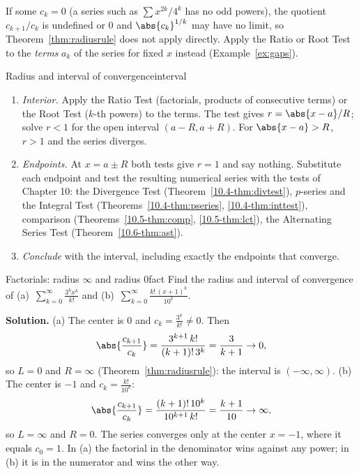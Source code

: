 \documentclass[11pt]{article}
\begin{document}
\begin{warn}
If some $c_k=0$ (a series such as $\sum x^{2k}/4^k$ has no odd powers), the quotient $c_{k+1}/c_k$ is undefined or $0$ and $\abs{c_k}^{1/k}$ may have no limit, so Theorem~\ref{thm:radiusrule} does not apply directly. Apply the Ratio or Root Test to the \emph{terms} $a_k$ of the series for fixed $x$ instead (Example~\ref{ex:gaps}).
\end{warn}

\begin{proc}{Radius and interval of convergence}{interval}
\begin{enumerate}[nosep]
  \item \emph{Interior.} Apply the Ratio Test (factorials, products of consecutive terms) or the Root Test ($k$-th powers) to the terms. The test gives $r=\abs{x-a}/R$; solve $r<1$ for the open interval $(a-R,a+R)$. For $\abs{x-a}>R$, $r>1$ and the series diverges.
  \item \emph{Endpoints.} At $x=a\pm R$ both tests give $r=1$ and say nothing. Substitute each endpoint and test the resulting numerical series with the tests of Chapter 10: the Divergence Test (Theorem~\ref{10.4-thm:divtest}), $p$-series and the Integral Test (Theorems~\ref{10.4-thm:pseries}, \ref{10.4-thm:inttest}), comparison (Theorems~\ref{10.5-thm:comp}, \ref{10.5-thm:lct}), the Alternating Series Test (Theorem~\ref{10.6-thm:ast}).
  \item \emph{Conclude} with the interval, including exactly the endpoints that converge.
\end{enumerate}
\end{proc}

\begin{exmp}{Factorials: radius $\infty$ and radius $0$}{fact}
Find the radius and interval of convergence of (a)~$\displaystyle\sum_{k=0}^\infty\frac{3^kx^k}{k!}$ and (b)~$\displaystyle\sum_{k=0}^\infty\frac{k!\,(x+1)^k}{10^k}$.

\textbf{Solution.} (a) The center is $0$ and $c_k=\frac{3^k}{k!}\ne0$. Then
\[
\abs{\frac{c_{k+1}}{c_k}}=\frac{3^{k+1}\,k!}{(k+1)!\,3^k}=\frac3{k+1}\to0 ,
\]
so $L=0$ and $R=\infty$ (Theorem~\ref{thm:radiusrule}): the interval is $(-\infty,\infty)$. (b) The center is $-1$ and $c_k=\frac{k!}{10^k}$:
\[
\abs{\frac{c_{k+1}}{c_k}}=\frac{(k+1)!\,10^k}{10^{k+1}\,k!}=\frac{k+1}{10}\to\infty ,
\]
so $L=\infty$ and $R=0$. The series converges only at the center $x=-1$, where it equals $c_0=1$. In (a) the factorial in the denominator wins against any power; in (b) it is in the numerator and wins the other way.
\end{exmp}
\end{document}
